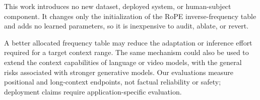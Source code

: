This work introduces no new dataset, deployed system, or human-subject
component. It changes only the initialization of the RoPE inverse-frequency
table and adds no learned parameters, so it is inexpensive to audit, ablate,
or revert.

A better allocated frequency table may reduce the adaptation or inference
effort required for a target context range. The same mechanism could also be
used to extend the context capabilities of language or video models, with the
general risks associated with stronger generative models. Our evaluations
measure positional and long-context endpoints, not factual reliability or
safety; deployment claims require application-specific evaluation.

